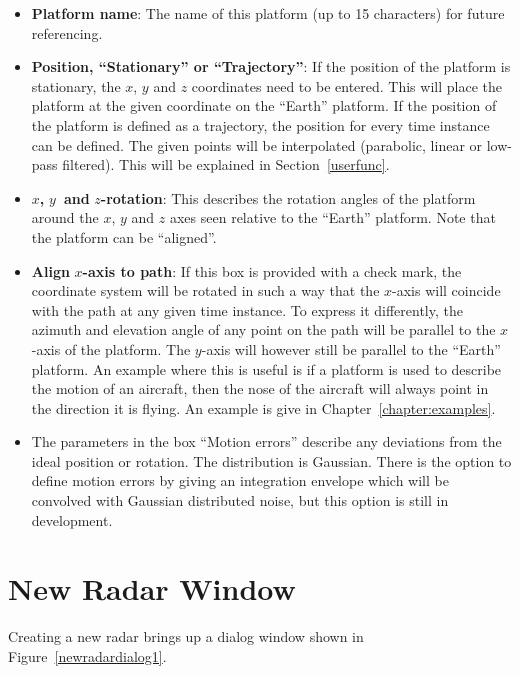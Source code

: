 \begin{itemize}
\item  \textbf{Platform name}: The name of this platform (up to 15
characters) for future referencing.

\item  \textbf{Position, ``Stationary'' or ``Trajectory''}: If the position
of the platform is stationary, the $x$, $y$ and $z$ coordinates need to be
entered. This will place the platform at the given coordinate on the
``Earth'' platform. If the position of the platform is defined as a
trajectory, the position for every time instance can be defined. The given
points will be interpolated (parabolic, linear or low-pass filtered). This
will be explained in Section~\ref{userfunc}.

\item  $x$\textbf{, }$y$\textbf{\ and }$z$\textbf{-rotation}: This describes
the rotation angles of the platform around the $x$, $y$ and $z$ axes seen
relative to the ``Earth'' platform. Note that the platform can be
``aligned''.

\item  \textbf{Align }$x$\textbf{-axis to path}: If this box is provided
with a check mark, the coordinate system will be rotated in such a way that
the $x$-axis will coincide with the path at any given time instance. To
express it differently, the azimuth and elevation angle of any point on the
path will be parallel to the $x$-axis of the platform. The $y$-axis will
however still be parallel to the ``Earth'' platform. An example where this
is useful is if a platform is used to describe the motion of an aircraft,
then the nose of the aircraft will always point in the direction it is
flying. An example is give in Chapter~\ref{chapter:examples}.

\item  The parameters in the box ``Motion errors'' describe any deviations
from the ideal position or rotation. The distribution is Gaussian. There is
the option to define motion errors by giving an integration envelope which
will be convolved with Gaussian distributed noise, but this option is still
in development.
\end{itemize}

\section{New Radar Window}

\label{newradar}Creating a new radar brings up a dialog window shown in
Figure~\ref{newradardialog1}.

